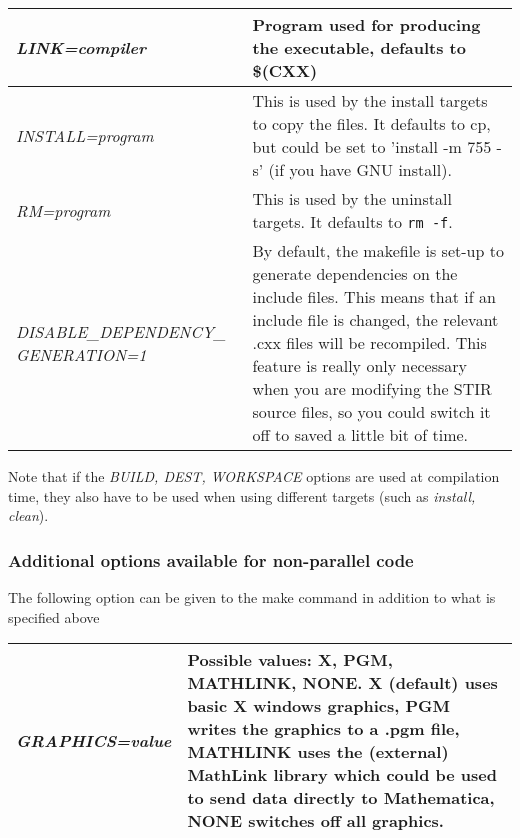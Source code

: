 \documentclass{article}
\begin{document}
\begin{longtable}{|p{\MakeTableFirstCol}|p{\MakeTableSecondCol}|}
{\raggedright
\textit{LINK=compiler}} & 

{\raggedright
Program used for producing the executable, defaults to \$(CXX)} \\
\hline

{\raggedright
\textit{INSTALL=program}} & 

{\raggedright
This is used by the install targets to copy the files. It defaults 
to cp, but could be set to 'install -m 755 -s' (if you have GNU 
install).} \\
\hline

{\raggedright
\textit{RM=program}} & 

{\raggedright
This is used by the uninstall targets. It defaults to \texttt{rm -f}.} \\
\hline

{\raggedright
\textit{DISABLE\_DEPENDENCY\_\linebreak
GENERATION=1}} & 

{\raggedright
By default, the makefile is set-up to generate dependencies 
on the include files. This means that if an include file is changed, 
the relevant .cxx files will be recompiled. This feature is really 
only necessary when you are modifying the STIR source files, 
so you could switch it off to saved a little bit of time.} \\
\hline
\end{longtable}


Note that if the \textit{BUILD, DEST, WORKSPACE} options are used at 
compilation time, they also have to be used when using different 
targets (such as \textit{install, clean}).
\subsubsection{
Additional options available for non-parallel code}
\label{sec:compilationgraphics}
The following option can be given to the make command in addition 
to what is specified above

\begin{longtable}{|p{\MakeTableFirstCol}|p{\MakeTableSecondCol}|}
\hline
{\raggedright \textit{GRAPHICS=value}} & 
{\raggedright Possible values: X, PGM, MATHLINK, NONE. X (default) uses basic 
X windows graphics, PGM writes the graphics to a .pgm file, MATHLINK 
uses the (external) MathLink library which could be used to send 
data directly to Mathematica, NONE switches off all graphics.} \\
\hline
\end{longtable}
\end{document}
